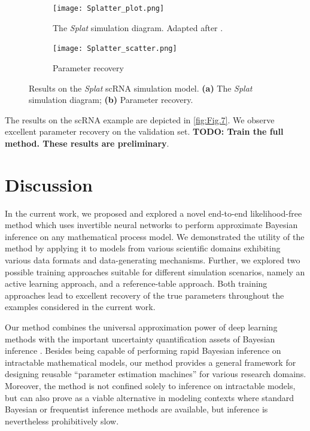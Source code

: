 \documentclass[9pt,twoside,lineno]{pnas-new}
\begin{document}
\begin{figure}[H]
\centering
\begin{subfigure}{.49\textwidth}
    \centering
    \texttt{[image: Splatter\_plot.png]}
    \caption{The \textit{Splat} simulation diagram. Adapted after \cite{zappia2017splatter}.}
    \label{fig:Fig.7a}
\end{subfigure}
\begin{subfigure}{.49\textwidth}
    \centering
    \texttt{[image: Splatter\_scatter.png]}
    \caption{Parameter recovery }
    \label{fig:Fig.7b}
\end{subfigure}
\caption[short]{Results on the \textit{Splat} scRNA simulation model. \textbf{(a)} The \textit{Splat} simulation diagram; \textbf{(b)} Parameter recovery.} \label{fig:Fig.7}
\end{figure}
The results on the scRNA example are depicted in \autoref{fig:Fig.7}. We observe excellent parameter recovery on the validation set. \textbf{TODO: Train the full method. These results are preliminary}.

\section*{Discussion}

In the current work, we proposed and explored a novel end-to-end likelihood-free method which uses invertible neural networks to perform approximate Bayesian inference on any mathematical process model. We demonstrated the utility of the method by applying it to models from various scientific domains exhibiting various data formats and data-generating mechanisms. Further, we explored two possible training approaches suitable for different simulation scenarios, namely an active learning approach, and a reference-table approach. Both training approaches lead to excellent recovery of the true parameters throughout the examples considered in the current work.

Our method combines the universal approximation power of deep learning methods with the important uncertainty quantification assets of Bayesian inference \cite{kendall2017uncertainties, gelman2013bayesian}. Besides being capable of performing rapid Bayesian inference on intractable mathematical models, our method provides a general framework for designing reusable “parameter estimation machines” for various research domains. Moreover, the method is not confined solely to inference on intractable models, but can also prove as a viable alternative in modeling contexts where standard Bayesian or frequentist inference methods are available, but inference is nevertheless prohibitively slow. 
\end{document}
